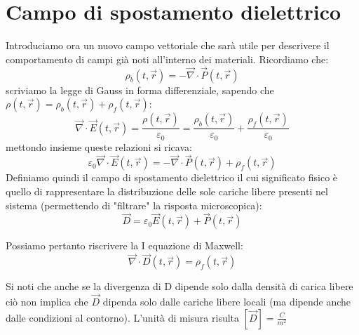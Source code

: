 \documentclass{book}
\begin{document}
\section{Campo di spostamento dielettrico}
Introduciamo ora un nuovo campo vettoriale che sarà utile per descrivere il comportamento di campi già noti all'interno dei materiali. Ricordiamo che: 
$$
\rho_b(t,\vec{r}) = -\vec{\nabla}\cdot \vec{P}(t,\vec{r})
$$
scriviamo la legge di Gauss in forma differenziale, sapendo che $\rho(t,\vec{r})=\rho_b(t,\vec{r})+\rho_f(t,\vec{r})$:
$$
\vec{\nabla}\cdot\vec{E}(t,\vec{r})= \frac{\rho(t,\vec{r})}{\varepsilon_0}= \frac{\rho_b(t,\vec{r})}{\varepsilon_0} + \frac{\rho_f(t,\vec{r})}{\varepsilon_0}
$$
mettondo insieme queste relazioni si ricava: 
$$
\varepsilon_0\vec{\nabla}\cdot\vec{E}(t,\vec{r}) = -\vec{\nabla}\cdot\vec{P}(t,\vec{r}) + \rho_f(t,\vec{r})
$$
Definiamo quindi il campo di spostamento dielettrico il cui significato fisico è quello di rappresentare la distribuzione delle sole cariche libere presenti nel sistema (permettendo di "filtrare" la risposta microscopica): 
$$
\vec{D} =\varepsilon_0\vec{E}(t,\vec{r})  +\vec{P}(t,\vec{r}) 
$$

Possiamo pertanto riscrivere la I equazione di Maxwell: 
$$
\boxed{\vec{\nabla}\cdot\vec{D}(t,\vec{r}) = \rho_f(t,\vec{r})}
$$

Si noti che anche se la divergenza di D dipende solo dalla densità di carica libere ciò non implica che $\vec{D}$ dipenda solo dalle cariche libere locali (ma dipende anche dalle condizioni al contorno).  L'unità di misura risulta $[\vec{D}] = \frac{C}{m^2}$
\end{document}
